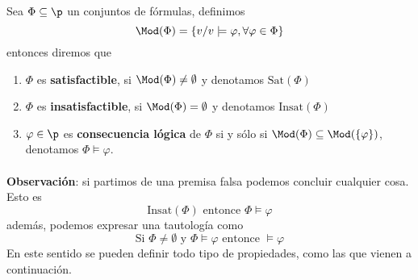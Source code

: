 \begin{definition} Sea $\Phi \subseteq \p$ un conjuntos de fórmulas, definimos 
\[ \Mod (\Phi)= \{ v / v \models \varphi, \forall \varphi \in \Phi \} \]
entonces diremos que 
\begin{enumerate}
	\item $\Phi$ es \textbf{satisfactible}, si $\Mod (\Phi) \neq \emptyset$ y denotamos $\mbox{Sat}(\Phi)$
	\item $\Phi$ es \textbf{insatisfactible}, si $\Mod (\Phi) = \emptyset$ y denotamos $\mbox{Insat}(\Phi)$
	\item $\varphi \in \p$ es \textbf{consecuencia lógica} de $\Phi$ si y sólo si $\Mod (\Phi) \subseteq\Mod (\{\varphi \})$, denotamos $\Phi \models \varphi$.
\end{enumerate} 
\end{definition}
\paragraph{}
\addtocounter{obs}{1}
\textbf{Observación}: si partimos de una premisa falsa podemos concluir cualquier cosa. Esto es 
\[ \mbox{Insat}(\Phi) \mbox{ entonce } \Phi \models \varphi \]
además, podemos expresar una tautología como 
\[ \mbox{Si } \Phi \neq \emptyset \mbox{ y } \Phi \models \varphi \mbox{ entonce } \models \varphi \]
En este sentido se pueden definir todo tipo de propiedades, como las que vienen a continuación. 

